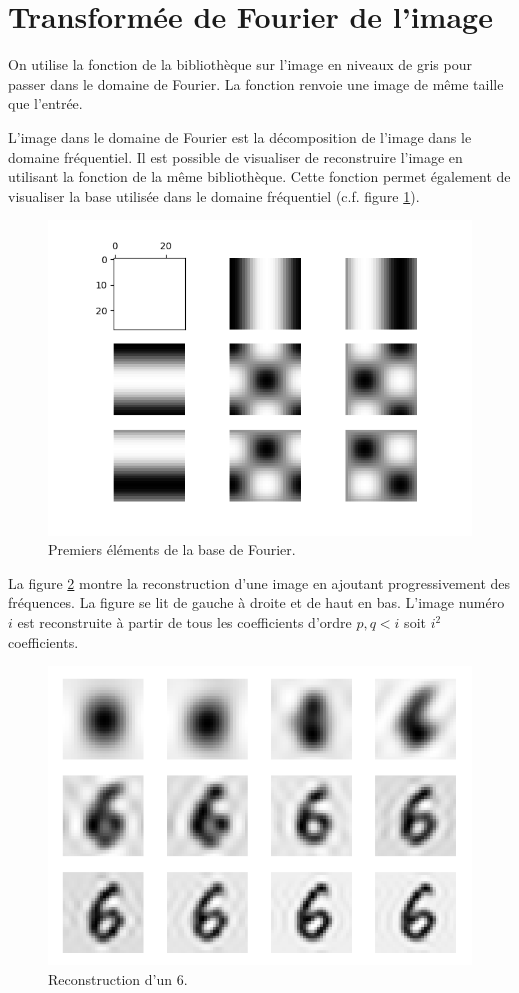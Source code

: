 \section{Transformée de Fourier de l'image}

On utilise la fonction  de la bibliothèque  sur 
l'image en niveaux de gris pour passer dans le domaine de Fourier.
La fonction renvoie une image de même taille que l'entrée.

L'image dans le domaine de Fourier est la décomposition de l'image dans le domaine 
fréquentiel.
Il est possible de visualiser de reconstruire l'image en utilisant la 
fonction  de la même bibliothèque.
Cette fonction permet également de visualiser la base utilisée dans le domaine 
fréquentiel (c.f.\/ figure \ref{fig:freq-basis}).

\begin{figure}[h]
  \centering
  \includegraphics[scale=0.6]{assets/fft-basis}
  \caption{Premiers éléments de la base de Fourier.}
  \label{fig:freq-basis}
\end{figure}

La figure \ref{fig:fft-image-reconstruction} montre la reconstruction d'une 
image en ajoutant progressivement des fréquences.
La figure se lit de gauche à droite et de haut en bas. 
L'image numéro $i$ est reconstruite à partir de tous les coefficients 
d'ordre $p,q < i$ soit $i^2$ coefficients.

\begin{figure}[h]
  \centering
  \includegraphics[scale=0.6]{assets/fft-image-num62-reconstruction}
  \caption{Reconstruction d'un $6$.}
  \label{fig:fft-image-reconstruction}
\end{figure}


